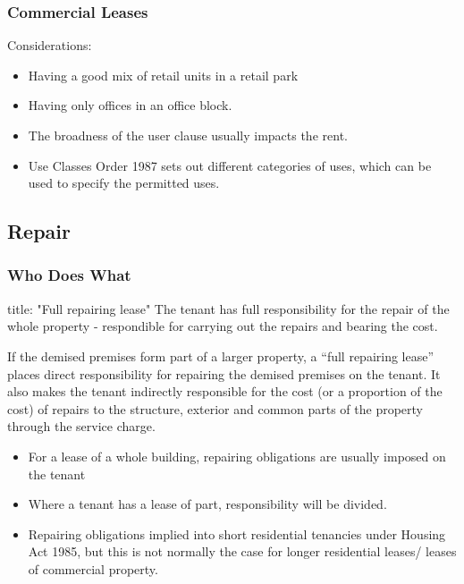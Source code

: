 \documentclass[
]{article}
\newenvironment{Shaded}{}{}
\newcommand{\NormalTok}[1]{#1}
\providecommand{\tightlist}{%
  \setlength{\itemsep}{0pt}\setlength{\parskip}{0pt}}
\begin{document}
\hypertarget{commercial-leases}{%
\subsubsection{Commercial Leases}\label{commercial-leases}}

Considerations:

\begin{itemize}
\tightlist
\item
  Having a good mix of retail units in a retail park
\item
  Having only offices in an office block.
\item
  The broadness of the user clause usually impacts the rent.
\item
  Use Classes Order 1987 sets out different categories of uses, which
  can be used to specify the permitted uses.
\end{itemize}

\hypertarget{repair}{%
\subsection{Repair}\label{repair}}

\hypertarget{who-does-what}{%
\subsubsection{Who Does What}\label{who-does-what}}

\begin{Shaded}
\begin{Highlighting}[]
\NormalTok{title: "Full repairing lease" }
\NormalTok{The tenant has full responsibility for the repair of the whole property {-} respondible for carrying out the repairs and bearing the cost. }
\end{Highlighting}
\end{Shaded}

If the demised premises form part of a larger property, a ``full
repairing lease'' places direct responsibility for repairing the demised
premises on the tenant. It also makes the tenant indirectly responsible
for the cost (or a proportion of the cost) of repairs to the structure,
exterior and common parts of the property through the service charge.

\begin{itemize}
\tightlist
\item
  For a lease of a whole building, repairing obligations are usually
  imposed on the tenant
\item
  Where a tenant has a lease of part, responsibility will be divided.
\item
  Repairing obligations implied into short residential tenancies under
  Housing Act 1985, but this is not normally the case for longer
  residential leases/ leases of commercial property.
\end{itemize}
\end{document}
